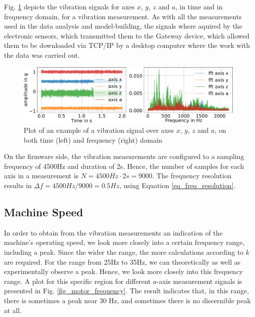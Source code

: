 \documentclass[conference]{IEEEtran}
\begin{document}
Fig. \ref{fig_example_signals} depicts the vibration signals for axes $x$, $y$, $z$ and $a$, in time and in frequency domain, for a vibration measurement. As with all the measurements used in the data analysis and model-building, the signals where aquired by the electronic sensors, which transmitted them to the Gateway device, which allowed them to be downloaded via TCP/IP by a desktop computer where the work with the data was carried out.



\begin{figure}[htbp]
\centering
\includegraphics[width=\columnwidth]{graphics/axes_time_fft/axes_time_fft_v2.pdf}
\caption{Plot of an example of a vibration signal over axes $x$, $y$, $z$ and $a$, on both time (left) and frequency (right) domain}
\label{fig_example_signals}
\end{figure}

On the firmware side, the vibration measurements are configured to a sampling frequency of 4500Hz and duration of 2s. Hence, the number of samples for each axis in a measurement is $N=4500Hz \cdot 2s = 9000$. The frequency resolution results in $\Delta f = 4500Hz/9000 = 0.5 Hz$, using Equation \ref{eq_freq_resolution}.

\subsection{Machine Speed}
\label{sec_machine_speed}

In order to obtain from the vibration measurements an indication of the machine's operating speed, we look more closely into a certain frequency range, including a peak. Since the wider the range, the more calculations according to $k$ are required. For the range from 25Hz to 35Hz, we can theoretically as well as experimentally observe a peak. Hence, we look more closely into this frequency range. A plot for this specific region for different $a$-axis measurement signals is presented in Fig. \ref{fig_motor_frequency}. The result indicates that, in this range, there is sometimes a peak near 30 Hz, and sometimes there is no discernible peak at all. 
\end{document}
